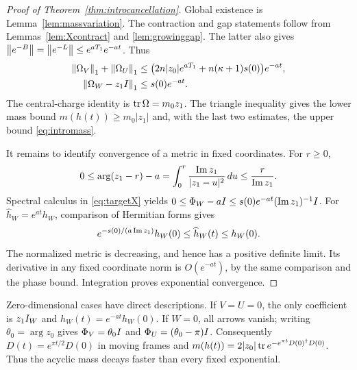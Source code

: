 \begin{proof}[Proof of Theorem~\ref{thm:introcancellation}]
Global existence is Lemma~\ref{lem:massvariation}.
The contraction and gap statements follow from
Lemmas~\ref{lem:Xcontract} and \ref{lem:growinggap}.
The latter also gives
$\left\lVert e^{-B}\right\rVert=\left\lVert e^{-L}\right\rVert\leq e^{aT_1}e^{-at}$.
Thus
\begin{align*}
 \left\lVert\Omega_V\right\rVert_1+\left\lVert\Omega_U\right\rVert_1
 &\leq\bigl(2n|z_0|e^{aT_1}+n(\kappa+1)s(0)\bigr)e^{-at},\\
 \left\lVert\Omega_W-z_1I\right\rVert_1&\leq s(0)e^{-at}.
\end{align*}
The central-charge identity is $\operatorname{tr}\Omega=m_0z_1$.
The triangle inequality gives the lower mass bound
$m(h(t))\geq m_0|z_1|$ and, with the last two estimates, the upper
bound \eqref{eq:intromass}.

It remains to identify convergence of a metric in fixed coordinates.
For $r\geq0$,
\[
 0\leq\arg(z_1-r)-a
 =\int_0^r\frac{\operatorname{Im} z_1}{|z_1-u|^2}\,du
 \leq\frac r{\operatorname{Im} z_1}.
\]
Spectral calculus in \eqref{eq:targetX} yields
$0\leq\Phi_W-aI\leq s(0)e^{-at}(\operatorname{Im} z_1)^{-1}I$.
For $\widehat h_W=e^{at}h_W$, comparison of Hermitian forms gives
\[
 e^{-s(0)/(a\operatorname{Im} z_1)}h_W(0)
 \leq\widehat h_W(t)\leq h_W(0).
\]
The normalized metric is decreasing, and hence has a positive definite
limit. Its derivative in any fixed coordinate norm is $O(e^{-at})$,
by the same comparison and the phase bound. Integration proves
exponential convergence.
\end{proof}

\begin{remark}\label{rem:zero}
Zero-dimensional cases have direct descriptions. If $V=U=0$, the only
coefficient is $z_1I_W$ and $h_W(t)=e^{-at}h_W(0)$.
If $W=0$, all arrows vanish; writing $\theta_0=\arg z_0$ gives
$\Phi_V=\theta_0I$ and $\Phi_U=(\theta_0-\pi)I$.
Consequently $D(t)=e^{\pi t/2}D(0)$ in moving frames and
$m(h(t))=2|z_0|\operatorname{tr} e^{-e^{\pi t}D(0)^\dagger D(0)}$.
Thus the acyclic mass decays faster than every fixed exponential.
\end{remark}
